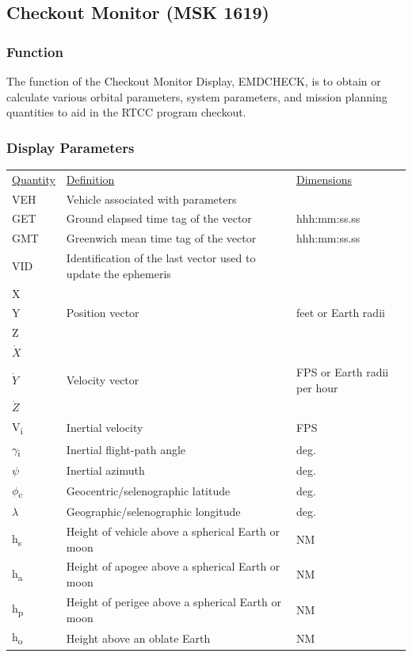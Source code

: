\documentclass[11pt]{article} %
\begin{document}
\subsection{Checkout Monitor (MSK 1619)}
\subsubsection{Function}
The function of the Checkout Monitor Display, EMDCHECK, is to obtain or calculate various orbital parameters, system parameters, and mission planning quantities to aid in the RTCC program checkout.
\newpage
\subsubsection{Display Parameters}
\begin{center}
\begin{tabular} { L{2cm} L{8cm} L{6cm} }
\underline{Quantity}&\underline{Definition}&\underline{Dimensions}\\
VEH&Vehicle associated with parameters&\\
GET&Ground elapsed time tag of the vector&hhh:mm:ss.ss\\
GMT&Greenwich mean time tag of the vector&hhh:mm:ss.ss\\
VID&Identification of the last vector used to update the ephemeris&\\
X&&\\
Y&Position vector&feet or Earth radii\\
Z&&\\
$\dot X$&\\
$\dot Y$&Velocity vector&FPS or Earth radii per hour\\
$\dot Z$&\\ 
V\textsubscript{i} &Inertial velocity&FPS\\
$\gamma$\textsubscript{i}&Inertial flight-path angle&deg.\\
$\psi$&Inertial azimuth&deg.\\
$\phi$\textsubscript{c}&Geocentric/selenographic latitude&deg.\\
$\lambda$&Geographic/selenographic longitude&deg.\\
h\textsubscript{s}&Height of vehicle above a spherical Earth or moon&NM\\
h\textsubscript{a}&Height of apogee above a spherical Earth or moon&NM\\
h\textsubscript{p}&Height of perigee above a spherical Earth or moon&NM\\
h\textsubscript{o}&Height above an oblate Earth&NM\\

\end{tabular}
\end{center}
\end{document}
